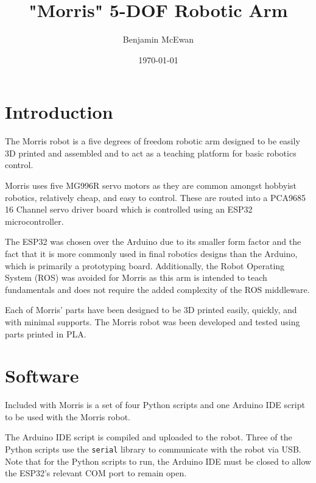 \documentclass[a4paper,11pt]{article}
\begin{document}
\title{\textbf{"Morris" 5-DOF Robotic Arm}}
\author{Benjamin McEwan}
\date{\today}
\maketitle

\tableofcontents


\newpage
\section{Introduction}
%      

The Morris robot is a five degrees of freedom robotic arm designed to be easily 3D printed and assembled and to act as a teaching platform for basic robotics control.

Morris uses five MG996R servo motors as they are common amongst hobbyist robotics, relatively cheap, and easy to control. These are routed into a PCA9685 16 Channel servo driver board which is controlled using an ESP32 microcontroller. 

The ESP32 was chosen over the Arduino due to its smaller form factor and the fact that it is more commonly used in final robotics designs than the Arduino, which is primarily a prototyping board. Additionally, the Robot Operating System (ROS) was avoided for Morris as this arm is intended to teach fundamentals and does not require the added complexity of the ROS middleware.

Each of Morris' parts have been designed to be 3D printed easily, quickly, and with minimal supports. The Morris robot was been developed and tested using parts printed in PLA.

\section{Software}
Included with Morris is a set of four Python scripts and one Arduino IDE script to be used with the Morris robot.

The Arduino IDE script is compiled and uploaded to the robot. Three of the Python scripts use the \texttt{serial} library to communicate with the robot via USB. Note that for the Python scripts to run, the Arduino IDE must be closed to allow the ESP32's relevant COM port to remain open.
\end{document}
